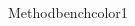 \documentclass[final,12pt]{beamer} %
\begin{document}
\begin{frame}
\begin{textblock*}{38.5cm}
\begin{posterblock}{Method}{benchcolor1}
\end{posterblock}
\end{textblock*}
% 
% 
% 
% 
% 

\end{frame}
\end{document}
